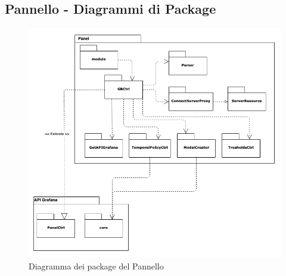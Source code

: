 \subsection{Pannello - Diagrammi di Package}
	\begin{figure}[H]
		\begin{center}
			\includegraphics[scale=0.55]{./images/panelPackage.png} 
		\end{center}
	\caption{Diagramma dei package del Pannello}
	\end{figure}

